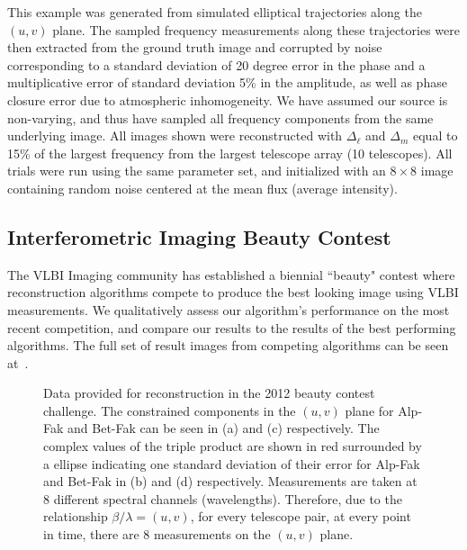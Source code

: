 This example was generated from simulated elliptical trajectories along the $(u,v)$ plane. The sampled frequency measurements along these trajectories were then extracted from the ground truth image and corrupted by noise corresponding to a standard deviation of 20 degree error in the phase and a multiplicative error of standard deviation 5\% in the amplitude, as well as phase closure error due to atmospheric inhomogeneity.  We have assumed our source is non-varying, and thus have sampled all frequency components from the same underlying image. All images shown were reconstructed with $\Delta_\ell$ and $\Delta_m$ equal to 15\% of the largest frequency from the largest telescope array (10 telescopes). All trials were run using the same parameter set, and initialized with an $8 \times 8$ image containing random noise centered at the mean flux (average intensity).

\subsection{Interferometric Imaging Beauty Contest}

The VLBI Imaging community has established a biennial ``beauty" contest where reconstruction algorithms compete to produce the best looking image using VLBI measurements. We qualitatively assess our algorithm's performance on the most recent competition, and compare our results to the results of the best performing algorithms. The full set of result images from competing algorithms can be seen at~\cite{baron20122012}. 

\begin{figure}[h!]
\centering

                                      
                    \caption{Data provided for reconstruction in the 2012 beauty contest challenge. The constrained components in the $(u,v)$ plane for Alp-Fak and Bet-Fak can be seen in (a) and (c) respectively. The complex values of the triple product are shown in red surrounded by a ellipse indicating one standard deviation of their error for Alp-Fak and Bet-Fak in (b) and (d) respectively. Measurements are taken at 8 different spectral channels (wavelengths). Therefore, due to the relationship $\beta/\lambda = (u,v)$, for every telescope pair, at every point in time, there are 8 measurements on the $(u,v)$ plane.   }
 \label{fig:data}
\end{figure}



